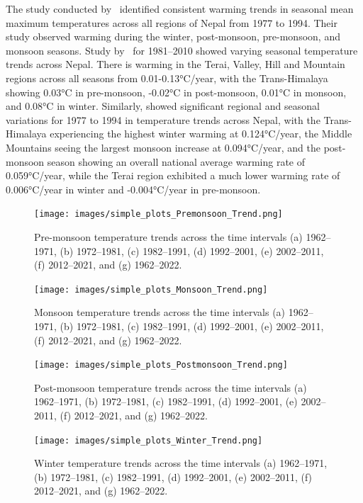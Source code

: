 The study conducted by~\textcite{shrestha_climate_2011} identified consistent warming trends in seasonal mean maximum temperatures across all regions of Nepal from 1977 to 1994. Their study observed warming during the winter, post-monsoon, pre-monsoon, and monsoon seasons.
Study  by~\textcite{nayava_spatial_2017} for 1981–2010 showed varying seasonal temperature trends across Nepal. There is warming in the Terai, Valley, Hill and Mountain regions across all seasons from 0.01-0.13°C/year, with the Trans-Himalaya showing 0.03°C in pre-monsoon, -0.02°C in post-monsoon, 0.01°C in monsoon, and 0.08°C in winter. Similarly, \textcite{shrestha_maximum_1999}  showed significant regional and seasonal variations for 1977 to 1994 in temperature trends across Nepal, with the Trans-Himalaya experiencing the highest winter warming at 0.124°C/year, the Middle Mountains seeing the largest monsoon increase at 0.094°C/year, and the post-monsoon season showing an overall national average warming rate of 0.059°C/year, while the Terai region exhibited a much lower warming rate of 0.006°C/year in winter and -0.004°C/year in pre-monsoon.


\begin{figure}[H] 
  \centering
  \texttt{[image: images/simple\_plots\_Premonsoon\_Trend.png]}  
  \caption{Pre-monsoon temperature trends across the time intervals (a) 1962–1971, (b) 1972–1981, (c) 1982–1991, (d) 1992–2001, (e) 2002–2011, (f) 2012–2021, and (g) 1962–2022.} 
  \label{fig:Pre_monsoon_temperature_trends}  
\end{figure}

\begin{figure}[H] 
  \centering
  \texttt{[image: images/simple\_plots\_Monsoon\_Trend.png]}  
  \caption{Monsoon temperature trends across the time intervals (a) 1962–1971, (b) 1972–1981, (c) 1982–1991, (d) 1992–2001, (e) 2002–2011, (f) 2012–2021, and (g) 1962–2022.} 
  \label{fig:Monsoon_temperature_trends}  
\end{figure}

\begin{figure}[H] 
  \centering
  \texttt{[image: images/simple\_plots\_Postmonsoon\_Trend.png]}
  \caption{Post-monsoon temperature trends across the time intervals (a) 1962–1971, (b) 1972–1981, (c) 1982–1991, (d) 1992–2001, (e) 2002–2011, (f) 2012–2021, and (g) 1962–2022.}
  \label{fig:Post_monsoon_temperature_trends}  
\end{figure}

\begin{figure}[H] 
  \centering
  \texttt{[image: images/simple\_plots\_Winter\_Trend.png]}  
  \caption{Winter temperature trends across the time intervals (a) 1962–1971, (b) 1972–1981, (c) 1982–1991, (d) 1992–2001, (e) 2002–2011, (f) 2012–2021, and (g) 1962–2022.} 
  \label{fig:Winter_temperature_trends}  
\end{figure}

